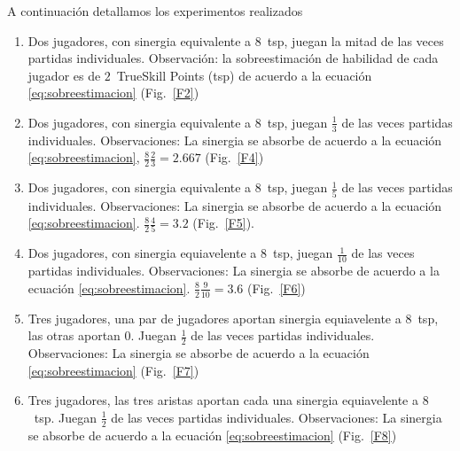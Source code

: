 \documentclass[a4paper,11pt]{book}
\theoremstyle{definition}
\begin{document}
A continuaci\'on detallamos los experimentos realizados

\begin{enumerate}

 \item Dos jugadores, con sinergia equivalente a $8$~tsp, juegan la mitad de las veces partidas individuales. Observaci\'on: la sobreestimaci\'on de habilidad de cada jugador es de $2$~TrueSkill Points (tsp) de acuerdo a la ecuaci\'on \ref{eq:sobreestimacion} (Fig.~\ref{F2})

 \item Dos jugadores, con sinergia equivalente a $8$~tsp, juegan $\frac{1}{3}$ de las veces partidas individuales. Observaciones: La sinergia se absorbe de acuerdo a la ecuaci\'on \ref{eq:sobreestimacion}, $\frac{8}{2}\frac{2}{3} = 2.667$ (Fig.~\ref{F4})

 \item Dos jugadores, con sinergia equivalente a $8$~tsp, juegan $\frac{1}{5}$ de las veces partidas individuales. Observaciones: La sinergia se absorbe de acuerdo a la ecuaci\'on \ref{eq:sobreestimacion}. $\frac{8}{2}\frac{4}{5} = 3.2$ (Fig.~\ref{F5}).

 \item Dos jugadores, con sinergia equiavelente a $8$~tsp, juegan $\frac{1}{10}$ de las veces partidas individuales. Observaciones: La sinergia se absorbe de acuerdo a la ecuaci\'on \ref{eq:sobreestimacion}. $\frac{8}{2}\frac{9}{10} = 3.6 $ (Fig.~\ref{F6})

 \item  Tres jugadores, una par de jugadores aportan sinergia equiavelente a $8$~tsp, las otras aportan $0$. Juegan $\frac{1}{2}$ de las veces partidas individuales. Observaciones: La sinergia se absorbe de acuerdo a la ecuaci\'on \ref{eq:sobreestimacion} (Fig.~\ref{F7})

 \item  Tres jugadores, las tres aristas aportan cada una sinergia equiavelente a $8$~tsp. Juegan $\frac{1}{2}$ de las veces partidas individuales. Observaciones: La sinergia se absorbe de acuerdo a la ecuaci\'on \ref{eq:sobreestimacion} (Fig.~\ref{F8})

\end{enumerate}
\end{document}
